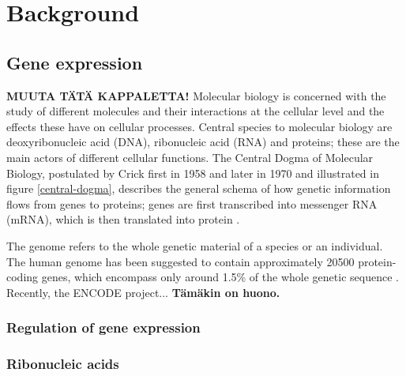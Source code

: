 


\section{Background}\label{background}











\subsection{Gene expression}\label{gene-expression}

\textbf{MUUTA TÄTÄ KAPPALETTA!} Molecular biology is concerned with the study
of different molecules and their interactions at the cellular level and the
effects these have on cellular processes. Central species to molecular biology
are deoxyribonucleic acid (DNA), ribonucleic acid (RNA) and proteins; these
are the main actors of different cellular functions. The Central Dogma of
Molecular Biology, postulated by Crick first in 1958 and later in 1970 and
illustrated in figure \ref{central-dogma}, describes the general schema of
how genetic information flows from genes to proteins; genes are first
transcribed into messenger RNA (mRNA), which is then translated into protein
\citep{Crick1970,T0}.

The genome refers to the whole genetic material of a species or an individual.
The human genome has been suggested to contain approximately 20500 protein-
coding genes, which encompass only around 1.5\% of the whole genetic sequence
\citep{Clamp2007,MistäSilvaKeksinyTonProssan}. Recently, the ENCODE project...
\textbf{Tämäkin on huono.}




\subsubsection{Regulation of gene expression}\label{regulation-of-gene-expression}





\subsubsection{Ribonucleic acids}\label{ribonucleic-acids}







